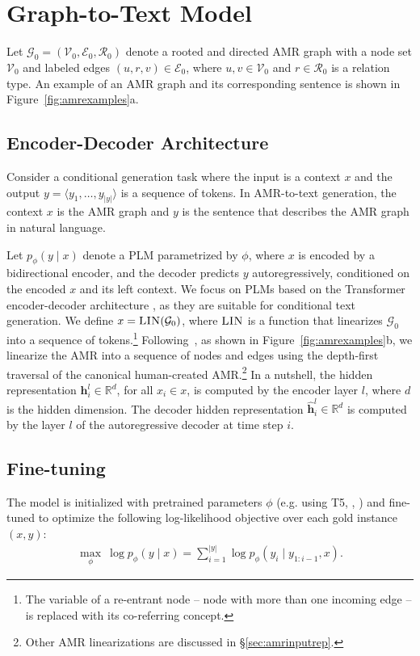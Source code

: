 \documentclass[11pt]{article}
\begin{document}
\section{Graph-to-Text Model}

Let $\mathcal{G}_0 = (\mathcal{V}_0, \mathcal{E}_0, \mathcal{R}_0)$ denote a rooted and directed AMR graph with a node set $\mathcal{V}_0$ and labeled edges $ (u, r, v) \in \mathcal{E}_0$, where $u, v \in \mathcal{V}_0$ and $r \in \mathcal{R}_0$ is a relation type. An example of an AMR graph and its corresponding sentence is shown in Figure~\ref{fig:amrexamples}a.

\subsection{Encoder-Decoder Architecture}
\label{sec:baselinemodel}
Consider a conditional generation task where the input is a context $x$ and the output $y = \langle y_1,\dots,y_{|y|} \rangle$ is a sequence of tokens. In AMR-to-text generation, the context $x$ is the AMR graph and $y$ is the sentence that describes the AMR graph in natural language. 

Let $p_\phi(y \mid x)$ denote a PLM parametrized by $\phi$, where $x$ is encoded by a bidirectional encoder, and the decoder predicts $y$ autoregressively, conditioned on the encoded $x$ and its left context. We focus on PLMs based on the Transformer encoder-decoder architecture \cite{NIPS2017_7181}, as they are suitable for conditional text generation. We define $x = \textsc{LIN}(\mathcal{G}_0)$, where $\textsc{LIN}$ is a function that linearizes $\mathcal{G}_0$ into a sequence of tokens.\footnote{The variable of a re-entrant node -- node with more than one incoming edge -- is replaced with its co-referring concept.} Following~\citet{damonte-cohen-2019-structural}, as shown in Figure~\ref{fig:amrexamples}b, we linearize the AMR into a sequence of nodes and edges using the depth-first traversal of the canonical human-created AMR.\footnote{Other AMR linearizations are discussed in \S\ref{sec:amrinputrep}.} In a nutshell, the hidden representation $\mathbf{h}^{l}_i \in \mathbb{R}^{d}$, for all $x_i \in x$, is computed by the encoder layer $l$, where $d$ is the hidden dimension. The decoder hidden representation $\hat{\mathbf{h}}_{i}^{l} \in \mathbb{R}^{d}$ is computed by the layer $l$ of the autoregressive decoder at time step $i$.


\subsection{Fine-tuning}
The model is initialized with pretrained parameters $\phi$ (e.g. using T5, \citeauthor{2019t5}, \citeyear{2019t5}) and fine-tuned to optimize the following log-likelihood objective over each gold instance $(x, y)$:
\begin{align}
\max_{\phi} ~\log p_\phi(y \mid x) = \sum_{i=1}^{|y|}  \log p_\phi(y_i \mid y_{1:i-1}, x) \text{.}
    \label{eqn:loss}
\end{align}
\end{document}
